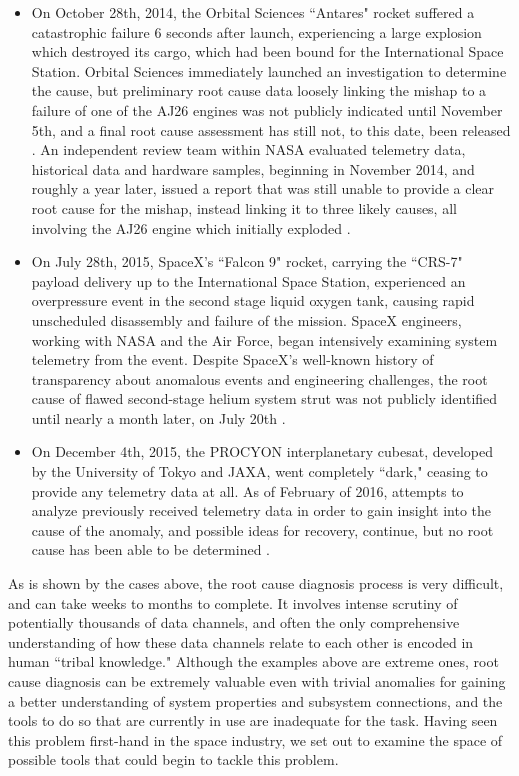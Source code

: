 \begin{itemize}

\item On October 28th, 2014, the Orbital Sciences ``Antares" rocket suffered a catastrophic failure 6 seconds after launch, experiencing a large explosion which destroyed its cargo, which had been bound for the International Space Station. Orbital Sciences immediately launched an investigation to determine the cause, but preliminary root cause data loosely linking the mishap to a failure of one of the AJ26 engines was not publicly indicated until November 5th, and a final root cause assessment has still not, to this date, been released \cite{spaceflight_antares}. An independent review team within NASA evaluated telemetry data, historical data and hardware samples, beginning in November 2014, and roughly a year later, issued a report that was still unable to provide a clear root cause for the mishap, instead linking it to three likely causes, all involving the AJ26 engine which initially exploded \cite{nasa_orb3}.

\item On July 28th, 2015, SpaceX's ``Falcon 9" rocket, carrying the ``CRS-7" payload delivery up to the International Space Station, experienced an overpressure event in the second stage liquid oxygen tank, causing rapid unscheduled disassembly and failure of the mission. SpaceX engineers, working with NASA and the Air Force, began intensively examining system telemetry from the event. Despite SpaceX's well-known history of transparency about anomalous events and engineering challenges, the root cause of flawed second-stage helium system strut was not publicly identified until nearly a month later, on July 20th \cite{spacex_crs7}.

\item On December 4th, 2015, the PROCYON interplanetary cubesat, developed by the University of Tokyo and JAXA, went completely ``dark," ceasing to provide any telemetry data at all. As of February of 2016, attempts to analyze previously received telemetry data in order to gain insight into the cause of the anomaly, and possible ideas for recovery, continue, but no root cause has been able to be determined \cite{procyon_status}.

\end{itemize}

As is shown by the cases above, the root cause diagnosis process is very difficult, and can take weeks to months to complete. It involves intense scrutiny of potentially thousands of data channels, and often the only comprehensive understanding of how these data channels relate to each other is encoded in human ``tribal knowledge." Although the examples above are extreme ones, root cause diagnosis can be extremely valuable even with trivial anomalies for gaining a better understanding of system properties and subsystem connections, and the tools to do so that are currently in use are inadequate for the task. Having seen this problem first-hand in the space industry, we set out to examine the space of possible tools that could begin to tackle this problem.

